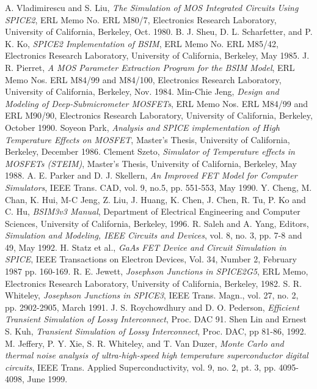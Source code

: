 

\begin{thebibliography}{99}
A. Vladimirescu and S. Liu, {\em The Simulation of MOS
 Integrated Circuits Using SPICE2},  ERL Memo No. ERL M80/7, Electronics
 Research Laboratory, University of  California,  Berkeley, Oct. 1980.
B. J. Sheu, D. L. Scharfetter, and P. K. Ko,
 {\em SPICE2 Implementation of BSIM}, ERL Memo No. ERL M85/42, Electronics
 Research Laboratory, University of California, Berkeley, May 1985.
J. R. Pierret, {\em A MOS Parameter Extraction Program
 for the BSIM Model},  ERL Memo Nos. ERL M84/99 and M84/100, Electronics
 Research Laboratory, University of  California, Berkeley, Nov. 1984.
 Min-Chie Jeng, {\em Design and Modeling of Deep-Submicrometer
 MOSFETs}, ERL Memo Nos. ERL M84/99 and ERL M90/90, Electronics
 Research Laboratory, University of California, Berkeley, October 1990.
Soyeon Park, {\em Analysis and SPICE implementation of High
 Temperature Effects on MOSFET}, Master's Thesis, University of California,
 Berkeley, December 1986.
Clement Szeto, {\em Simulator of Temperature effects in
 MOSFETs (STEIM)}, Master's Thesis, University of California, Berkeley,
 May 1988.
A. E. Parker and D. J. Skellern, {\em An Improved FET Model
 for Computer Simulators}, IEEE Trans. CAD, vol. 9, no.5, pp. 551-553,
 May 1990.
Y. Cheng, M. Chan, K. Hui, M-C Jeng, Z. Liu, J. Huang,
 K. Chen, J. Chen, R. Tu, P. Ko and C. Hu, {\em BSIM3v3 Manual},
 Department of Electrical Engineering and Computer Sciences,
 University of California, Berkeley, 1996.
R. Saleh and A. Yang, Editors, {\em Simulation and Modeling,
 IEEE Circuits and Devices}, vol. 8, no. 3, pp. 7-8 and 49, May 1992. 
H. Statz et al., {\em GaAs FET Device and Circuit
 Simulation in SPICE}, IEEE Transactions on Electron Devices, Vol. 34,
 Number 2, February 1987 pp. 160-169.
R. E. Jewett, {\em Josephson Junctions in SPICE2G5},
 ERL Memo, Electronics Research Laboratory, University of California,
 Berkeley, 1982.
S. R. Whiteley, {\em Josephson Junctions in SPICE3},
 IEEE Trans. Magn., vol. 27, no. 2, pp. 2902-2905, March 1991.
J. S. Roychowdhury and D. O. Pederson, {\em Efficient
 Transient Simulation of Lossy Interconnect}, Proc. DAC 91.
Shen Lin and Ernest S. Kuh, {\em Transient Simulation of Lossy
 Interconnect}, Proc. DAC, pp 81-86, 1992.
M. Jeffery, P. Y. Xie, S. R. Whiteley, and T. Van Duzer,
  {\em Monte Carlo and thermal noise analysis of ultra-high-speed high
  temperature superconductor digital circuits},
  IEEE Trans. Applied Superconductivity,
  vol. 9, no. 2, pt. 3, pp. 4095-4098, June 1999.
\end{thebibliography}

